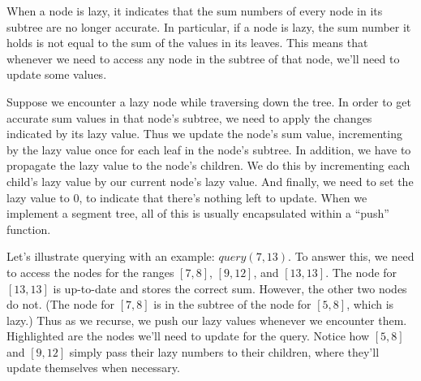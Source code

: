 When a node is lazy, it indicates that the sum numbers of every node in its subtree are no longer accurate. In particular, if a node is lazy, the sum number it holds is not equal to the sum of the values in its leaves. This means that whenever we need to access any node in the subtree of that node, we'll need to update some values.

Suppose we encounter a lazy node while traversing down the tree. In order to get accurate sum values in that node's subtree, we need to apply the changes indicated by its lazy value. Thus we update the node's sum value, incrementing by the lazy value once for each leaf in the node's subtree. In addition, we have to propagate the lazy value to the node's children. We do this by incrementing each child's lazy value by our current node's lazy value. And finally, we need to set the lazy value to $0$, to indicate that there's nothing left to update. When we implement a segment tree, all of this is usually encapsulated within a ``push'' function.

Let's illustrate querying with an example: $query(7,13)$. To answer this, we need to access the nodes for the ranges $[7,8]$, $[9,12]$, and $[13,13]$. The node for $[13,13]$ is up-to-date and stores the correct sum. However, the other two nodes do not. (The node for $[7,8]$ is in the subtree of the node for $[5,8]$, which is lazy.) Thus as we recurse, we push our lazy values whenever we encounter them. Highlighted are the nodes we'll need to update for the query. Notice how $[5,8]$ and $[9,12]$ simply pass their lazy numbers to their children, where they'll update themselves when necessary.

